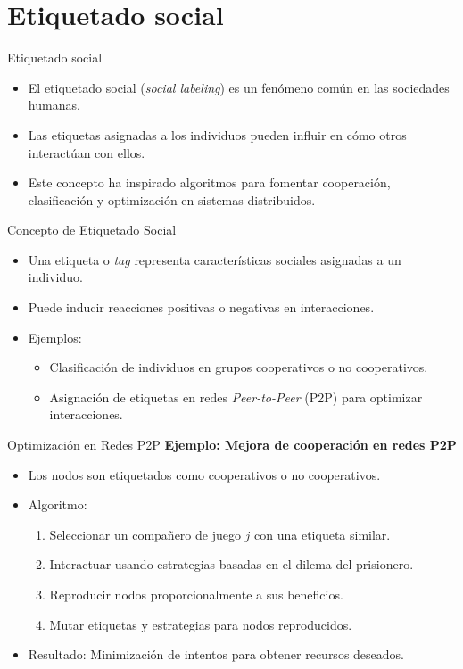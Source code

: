 \documentclass{beamer}
\begin{document}
\section{Etiquetado social}
\begin{frame}{Etiquetado social}
    \begin{itemize}
        \item El etiquetado social (\textit{social labeling}) es un fenómeno común en las sociedades humanas.
        \item Las etiquetas asignadas a los individuos pueden influir en cómo otros interactúan con ellos.
        \item Este concepto ha inspirado algoritmos para fomentar cooperación, clasificación y optimización en sistemas distribuidos.
    \end{itemize}
\end{frame}

\begin{frame}{Concepto de Etiquetado Social}
    \begin{itemize}
        \item Una etiqueta o \textit{tag} representa características sociales asignadas a un individuo.
        \item Puede inducir reacciones positivas o negativas en interacciones.
        \item Ejemplos:
        \begin{itemize}
            \item Clasificación de individuos en grupos cooperativos o no cooperativos.
            \item Asignación de etiquetas en redes \textit{Peer-to-Peer} (P2P) para optimizar interacciones.
        \end{itemize}
    \end{itemize}
\end{frame}

\begin{frame}{Optimización en Redes P2P}
    \textbf{Ejemplo: Mejora de cooperación en redes P2P}
    \begin{itemize}
        \item Los nodos son etiquetados como cooperativos o no cooperativos.
        \item Algoritmo:
        \begin{enumerate}
            \item Seleccionar un compañero de juego \( j \) con una etiqueta similar.
            \item Interactuar usando estrategias basadas en el dilema del prisionero.
            \item Reproducir nodos proporcionalmente a sus beneficios.
            \item Mutar etiquetas y estrategias para nodos reproducidos.
        \end{enumerate}
        \item Resultado: Minimización de intentos para obtener recursos deseados.
    \end{itemize}
\end{frame}
\end{document}
